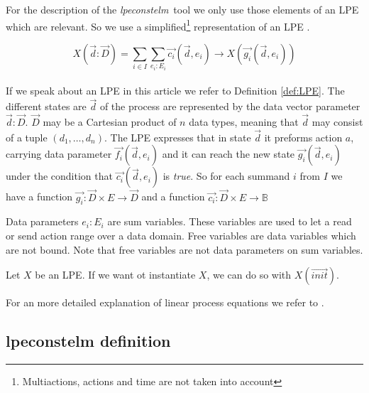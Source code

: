\documentclass[a4paper,10pt]{article}
\theoremstyle{plain}
\theoremstyle{definition}
\newcommand{\lpe}{linear process equation}
\newcommand{\tool}{\textit{lpeconstelm}}
\newcommand{\ovr}{\overrightarrow}
\newcommand{\ti}{\textit}
\begin{document}
For the description of the \tool\ tool we only use those elements of an LPE which are relevant. So we use a simplified\footnote{Multiactions, actions and time are not taken into account} representation of an LPE .
\begin{defn}\label{def:LPE}
\begin{displaymath}
X (\ovr{d}:\ovr{D}) = \sum_{i \in I} \sum_{e_i:E_i} \ovr{c_i} ( \ovr{d}, e_i ) \rightarrow X(\ovr{g_i}(\ovr{d},e_i))
\end{displaymath}\\
If we speak about an LPE in this article we refer to Definition \ref{def:LPE}.  The different states are $\ovr{d}$ of the process are represented by the data vector parameter $\ovr{d}:\ovr{D}$. $\ovr{D}$ may be a Cartesian product of $n$ data types, meaning that $\ovr{d}$ may consist of a tuple $(d_1, \ldots, d_n)$. The LPE expresses that in state $\ovr{d}$ it preforms action $a$, carrying data parameter $\ovr{f_i}(\ovr{d},e_i)$ and it can reach the new state $\ovr{g_i}(\ovr{d},e_i)$ under the condition that $\ovr{c_i}(\ovr{d},e_i)$ is \ti{true}. So for each summand $i$ from $I$ we have a function $\ovr{g_i}: \ovr{D} \times E \rightarrow \ovr{D}$ and a function $\ovr{c_i}: \ovr{D} \times E \rightarrow \mathbb{B}$


Data parameters $e_i : E_i$ are sum variables. These variables are used to let a read or send action range over a data domain. Free variables are data variables which are not bound. Note that free variables are not data parameters on sum variables.

Let $X$ be an LPE. If we want ot instantiate $X$, we can do so with $X(\ovr{init})$. 

For an more detailed explanation of \lpe s  we refer to \cite{LPE_info}.
\end{defn}

\subsection{lpeconstelm definition}\label{subsec:lpedef}
\end{document}
